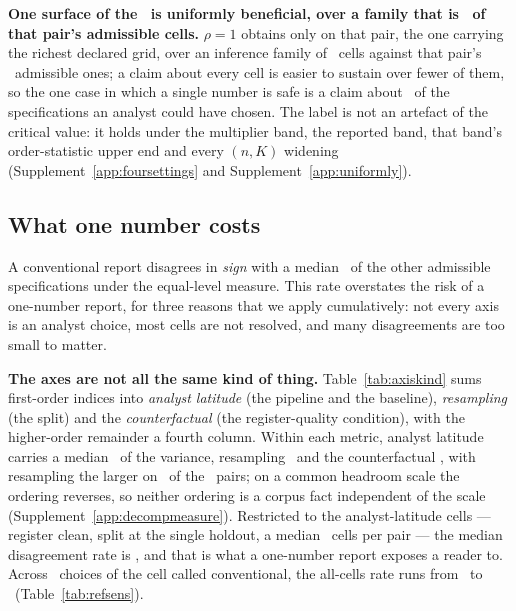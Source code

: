 \documentclass[11pt,3p,review,authoryear]{elsarticle}
\theoremstyle{definition}
\begin{document}
\textbf{One surface of the \nPairs\ is uniformly beneficial, over a family
that is \shareUniformFamilyPct\ of that pair's admissible cells.} $\rho = 1$
obtains only on that pair, the one carrying the richest
declared grid, over an inference family of \nCellsPerPairMedian\ cells
against that pair's \nCellsUniformPair\ admissible ones; a claim about every
cell is easier to sustain over fewer of them, so the one case in which a
single number is safe is a claim about \shareUniformFamilyPct\ of the
specifications an analyst could have chosen. The label is not an artefact of
the critical value: it holds under the multiplier band, the reported band,
that band's order-statistic upper end and every $(n, K)$ widening
(Supplement~\ref{app:foursettings} and Supplement~\ref{app:uniformly}).

\subsection{What one number costs}
\label{sec:results-regret}

A conventional report disagrees in \emph{sign} with a median
\misreportEqualPct\ of the other admissible specifications under the
equal-level measure. This rate overstates the risk of a one-number report,
for three reasons that we apply cumulatively: not every axis is an analyst
choice, most cells are not resolved, and many disagreements are too small to
matter.

\textbf{The axes are not all the same kind of thing.}
Table~\ref{tab:axiskind} sums first-order indices into \emph{analyst
latitude} (the pipeline and the baseline), \emph{resampling} (the split) and
the \emph{counterfactual} (the register-quality condition), with the
higher-order remainder a fourth column. Within each metric, analyst latitude
carries a median \shareLatitudePct\ of the variance, resampling
\shareResamplingPct\ and the counterfactual \shareCounterfactualPct, with
resampling the larger on \nPairsResamplingOverLatitude\ of the \nPairs\
pairs; on a common headroom scale the ordering reverses, so neither ordering
is a corpus fact independent of the scale (Supplement~\ref{app:decompmeasure}).
Restricted to the analyst-latitude cells --- register clean, split at the
single holdout, a median \nCellsLatitude\ cells per pair --- the median
disagreement rate is \misreportLatitudePct, and that is what a one-number
report exposes a reader to. Across \nRefSensVariants\ choices of the cell
called conventional, the all-cells rate runs from \refSensMinPct\ to
\refSensMaxPct\ (Table~\ref{tab:refsens}).
\end{document}
